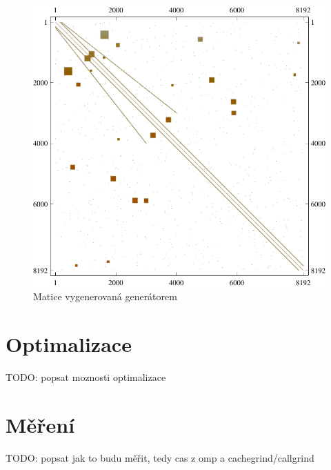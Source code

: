 \begin{figure}[H]
	\includegraphics[width=1.0\textwidth]{./images/generated_matrix}
	\caption{Matice vygenerovaná generátorem}
	\label{fig:aftOrsirr1}
\end{figure}

\section{Optimalizace}

TODO: popsat moznosti optimalizace






\section{Měření}

TODO: popsat jak to budu měřit, tedy cas z omp a cachegrind/callgrind